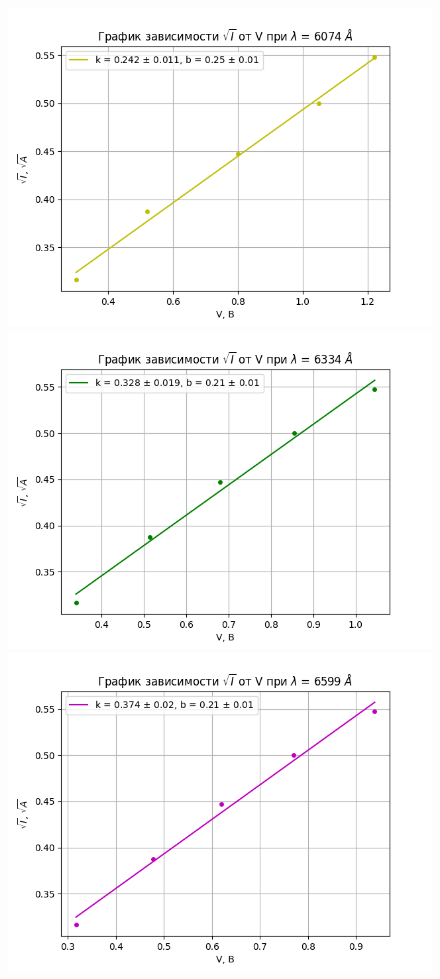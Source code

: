 \documentclass[a4paper,12pt]{article}
\begin{document}
\begin{figure}[H]
\begin{minipage}[b]{0.48\textwidth}
    \includegraphics[width=\textwidth]{line3.png}
  \end{minipage}
  \hfill
  \begin{minipage}[b]{0.48\textwidth}
    \includegraphics[width=\textwidth]{line4.png}
  \end{minipage}
  \hfill
  \begin{minipage}[b]{0.48\textwidth}
    \includegraphics[width=\textwidth]{line5.png}

\end{minipage}
\end{figure}
\end{document}
